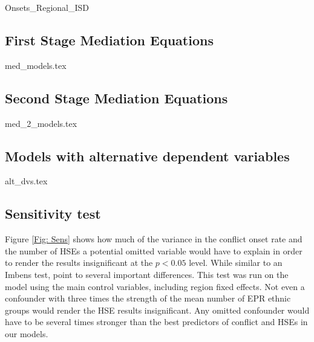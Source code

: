     {Onsets_Regional_ISD}
    
\clearpage    

\subsection{First Stage Mediation Equations}

    {med_models.tex}
    
\clearpage
 
\subsection{Second Stage Mediation Equations}

\clearpage
    {med_2_models.tex}
\clearpage  
 

\subsection{Models with alternative dependent variables}



    {alt_dvs.tex}
\clearpage  


\subsection{Sensitivity test}

Figure \ref{Fig: Sens} shows how much of the variance in the conflict onset rate and the number of HSEs a potential omitted variable would have to explain in order to render the results insignificant at the $p<0.05$ level. While similar to an Imbens test, \citet{Cinelli2020} point to several important differences. This test was run on the model using the main control variables, including region fixed effects. Not even a confounder with three times the strength of the mean number of EPR ethnic groups would render the HSE results insignificant. Any omitted confounder would have to be several times stronger than the best predictors of conflict and HSEs in our models.


